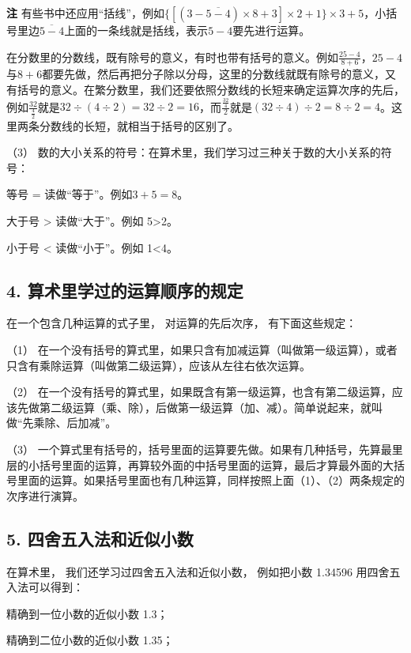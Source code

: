 \textbf{注}
有些书中还应用``括线''，例如\(\{[ (3 - \overline{5 - 4}) \times 8 + 3] \times 2 + 1\} \times 3 + 5\)，小括号里边\(\overline{5 - 4}\)上面的一条线就是括线，表示\(5-4\)要先进行运算。

在分数里的分数线，既有除号的意义，有时也带有括号的意义。例如\(\frac{25 - 4}{8 + 6}\)，\(25 - 4\)与\(8 + 6\)都要先做，然后再把分子除以分母，这里的分数线就既有除号的意义，又有括号的意义。在繁分数里，我们还要依照分数线的长短来确定运算次序的先后，例如\(\frac{32}{\frac{4}{2}}\)就是\(32 \div (4 \div 2) = 32 \div 2 = 16\)，而\(\frac{\frac{32}{4}}{2}\)就是\((32 \div 4) \div 2 = 8 \div 2 = 4\)。这里两条分数线的长短，就相当于括号的区别了。

（3）
数的大小关系的符号：在算术里，我们学习过三种关于数的大小关系的符号：

等号 = 读做``等于''。例如\(3+5=8\)。

大于号 \textgreater{} 读做``大于''。例如 5\textgreater 2。

小于号 \textless{} 读做``小于''。例如 1\textless 4。

\subsection{4. 算术里学过的运算顺序的规定}

在一个包含几种运算的式子里， 对运算的先后次序， 有下面这些规定：

（1）
在一个没有括号的算式里，如果只含有加减运算（叫做第一级运算），或者只含有乘除运算（叫做第二级运算），应该从左往右依次运算。

（2）
在一个没有括号的算式里，如果既含有第一级运算，也含有第二级运算，应该先做第二级运算（乘、除），后做第一级运算（加、减）。简单说起来，就叫做``先乘除、后加减''。

（3）
一个算式里有括号的，括号里面的运算要先做。如果有几种括号，先算最里层的小括号里面的运算，再算较外面的中括号里面的运算，最后才算最外面的大括号里面的运算。如果括号里面也有几种运算，同样按照上面（1）、（2）两条规定的次序进行演算。

\subsection{5. 四舍五入法和近似小数}

在算术里， 我们还学习过四舍五入法和近似小数， 例如把小数 1.34596
用四舍五入法可以得到：

精确到一位小数的近似小数 1.3；

精确到二位小数的近似小数 1.35；

